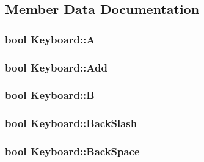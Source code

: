 \subsection{Member Data Documentation}
\hypertarget{class_keyboard_a33ee9c98d3b2426fec7b69fd4f42fb9a}{
\subsubsection[{A}]{\setlength{\rightskip}{0pt plus 5cm}bool Keyboard\-::\-A\hspace{0.3cm}{\ttfamily [private]}}}\label{class_keyboard_a33ee9c98d3b2426fec7b69fd4f42fb9a}
\hypertarget{class_keyboard_ae54476dd4f2f090740aa42dd230b9f24}{
\subsubsection[{Add}]{\setlength{\rightskip}{0pt plus 5cm}bool Keyboard\-::\-Add\hspace{0.3cm}{\ttfamily [private]}}}\label{class_keyboard_ae54476dd4f2f090740aa42dd230b9f24}
\hypertarget{class_keyboard_a6386fea4a95993853302e9bafb520eca}{
\subsubsection[{B}]{\setlength{\rightskip}{0pt plus 5cm}bool Keyboard\-::\-B\hspace{0.3cm}{\ttfamily [private]}}}\label{class_keyboard_a6386fea4a95993853302e9bafb520eca}
\hypertarget{class_keyboard_a78eb7c6bed698fe88c89ef8ce2071eab}{
\subsubsection[{Back\-Slash}]{\setlength{\rightskip}{0pt plus 5cm}bool Keyboard\-::\-Back\-Slash\hspace{0.3cm}{\ttfamily [private]}}}\label{class_keyboard_a78eb7c6bed698fe88c89ef8ce2071eab}
\hypertarget{class_keyboard_adf79ea45e1815dad75cda6933a61cdc7}{
\subsubsection[{Back\-Space}]{\setlength{\rightskip}{0pt plus 5cm}bool Keyboard\-::\-Back\-Space\hspace{0.3cm}{\ttfamily [private]}}}\label{class_keyboard_adf79ea45e1815dad75cda6933a61cdc7}
